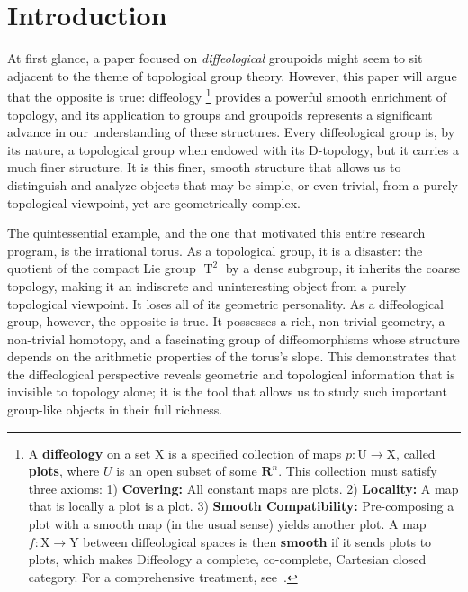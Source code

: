\documentclass[10pt,reqno,letterpaper,twoside]{amsart}
\theoremstyle{article}
\newcommand{\RR}{\mathbf{R}}
\def \U{\mathrm U}
\def \X{\mathrm X}
\def \Y{\mathrm Y}
\newcommand{\Torus}{\operatorname{T}}
\begin{document}
  \section*{Introduction}
  
  At first glance,
  a paper focused on \emph{diffeological} groupoids might seem to sit adjacent to the theme of topological group theory.
  However,
  this paper will argue that the opposite is true:
  diffeology%
  \footnote{A \textbf{diffeology} on a set $\X$ is a specified collection of maps $p: \U \to \X$,
  called \textbf{plots},
  where $U$ is an open subset of some $\RR^n$.
  This collection must satisfy three axioms:
  1) \textbf{Covering:} All constant maps are plots.
  2) \textbf{Locality:} A map that is locally a plot is a plot.
  3) \textbf{Smooth Compatibility:} Pre-composing a plot with a smooth map (in the usual sense) yields another plot.
  A map $f: \X \to \Y$ between diffeological spaces is then \textbf{smooth} if it sends plots to plots,
  which makes Diffeology a complete, co-complete, Cartesian closed category.
  For a comprehensive treatment, see~\cite{PIZ13}.}
  provides a powerful smooth enrichment of topology,
  and its application to groups and groupoids represents a significant advance in our understanding of these structures.
  Every diffeological group is,
  by its nature,
  a topological group when endowed with its D-topology,
  but it carries a much finer structure. It is this finer,
  smooth structure that allows us to distinguish and analyze objects that may be simple,
  or even trivial,
  from a purely topological viewpoint, yet are geometrically complex.
  
  The quintessential example,
  and the one that motivated this entire research program,
  is the irrational torus.
  As a topological group,
  it is a disaster:
  the quotient of the compact Lie group $\Torus^2$ by a dense subgroup,
  it inherits the coarse topology,
  making it an indiscrete and uninteresting object from a purely topological viewpoint.
  It loses all of its geometric personality.
  As a diffeological group,
  however,
  the opposite is true.
  It possesses a rich,
  non-trivial geometry,
  a non-trivial homotopy,
  and a fascinating group of diffeomorphisms whose structure depends on the arithmetic properties of the torus's slope.
  This demonstrates that the diffeological perspective reveals geometric and topological information that is invisible to topology alone;
  it is the tool that allows us to study such important group-like objects in their full richness.
  
\end{document}

